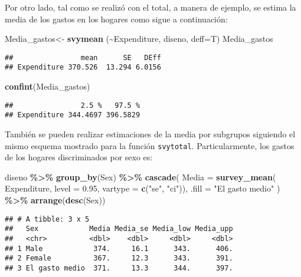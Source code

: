 \documentclass[
  12pt,
]{book}
\newenvironment{Shaded}{\begin{snugshade}}{\end{snugshade}}
\newcommand{\AttributeTok}[1]{\textcolor[rgb]{0.13,0.29,0.53}{#1}}
\newcommand{\FloatTok}[1]{\textcolor[rgb]{0.00,0.00,0.81}{#1}}
\newcommand{\FunctionTok}[1]{\textcolor[rgb]{0.13,0.29,0.53}{\textbf{#1}}}
\newcommand{\NormalTok}[1]{#1}
\newcommand{\OtherTok}[1]{\textcolor[rgb]{0.56,0.35,0.01}{#1}}
\newcommand{\SpecialCharTok}[1]{\textcolor[rgb]{0.81,0.36,0.00}{\textbf{#1}}}
\newcommand{\StringTok}[1]{\textcolor[rgb]{0.31,0.60,0.02}{#1}}
\begin{document}
Por otro lado, tal como se realizó con el total, a manera de ejemplo, se estima la media de los gastos en los hogares como sigue a continuación:

\begin{Shaded}
\begin{Highlighting}[]
\NormalTok{Media\_gastos}\OtherTok{\textless{}{-}} \FunctionTok{svymean}\NormalTok{ (}\SpecialCharTok{\textasciitilde{}}\NormalTok{Expenditure, diseno, }\AttributeTok{deff=}\NormalTok{T)}
\NormalTok{Media\_gastos}
\end{Highlighting}
\end{Shaded}

\begin{verbatim}
##                mean      SE   DEff
## Expenditure 370.526  13.294 6.0156
\end{verbatim}

\begin{Shaded}
\begin{Highlighting}[]
\FunctionTok{confint}\NormalTok{(Media\_gastos)}
\end{Highlighting}
\end{Shaded}

\begin{verbatim}
##                2.5 %   97.5 %
## Expenditure 344.4697 396.5829
\end{verbatim}

También se pueden realizar estimaciones de la media por subgrupos siguiendo el mismo esquema mostrado para la función \texttt{svytotal}. Particularmente, los gastos de los hogares discriminados por sexo es:

\begin{Shaded}
\begin{Highlighting}[]
\NormalTok{diseno }\SpecialCharTok{\%\textgreater{}\%} \FunctionTok{group\_by}\NormalTok{(Sex) }\SpecialCharTok{\%\textgreater{}\%}
  \FunctionTok{cascade}\NormalTok{(}
    \AttributeTok{Media =} \FunctionTok{survey\_mean}\NormalTok{(}
\NormalTok{      Expenditure, }\AttributeTok{level =} \FloatTok{0.95}\NormalTok{,}
       \AttributeTok{vartype =}  \FunctionTok{c}\NormalTok{(}\StringTok{"se"}\NormalTok{, }\StringTok{"ci"}\NormalTok{)),}
        \AttributeTok{.fill =} \StringTok{"El gasto medio"}\NormalTok{  ) }\SpecialCharTok{\%\textgreater{}\%}
  \FunctionTok{arrange}\NormalTok{(}\FunctionTok{desc}\NormalTok{(Sex))}
\end{Highlighting}
\end{Shaded}

\begin{verbatim}
## # A tibble: 3 x 5
##   Sex            Media Media_se Media_low Media_upp
##   <chr>          <dbl>    <dbl>     <dbl>     <dbl>
## 1 Male            374.     16.1      343.      406.
## 2 Female          367.     12.3      343.      391.
## 3 El gasto medio  371.     13.3      344.      397.
\end{verbatim}
\end{document}
